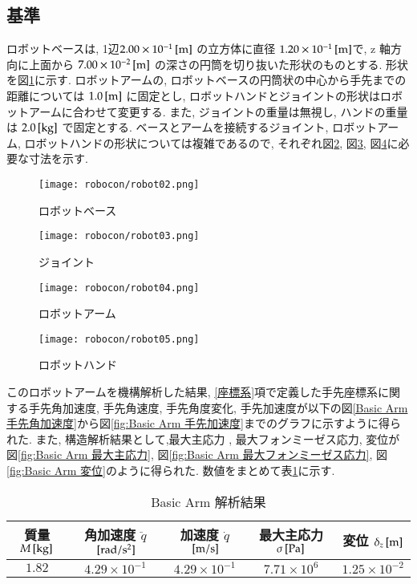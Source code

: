 \documentclass[10pt,b5paper,papersize,dvipdfmx]{jsbook}
\begin{document}
\subsection{基準}\label{基準}
ロボットベースは, 1辺$2.00\times10^{-1} \tani*{m}$ の立方体に直径 $1.20\times10^{-1} \tani*{m} $で,  z 軸方向に上面から $7.00\times10^{-2} \tani*{m}$ の深さの円筒を切り抜いた形状のものとする. 形状を図\ref{fig:ロボットベース}に示す. 
ロボットアームの, ロボットベースの円筒状の中心から手先までの距離については $1.0\tani*{m}$ に固定とし, ロボットハンドとジョイントの形状はロボットアームに合わせて変更する. また, ジョイントの重量は無視し, ハンドの重量は $2.0\tani*{kg}$ で固定とする. 
ベースとアームを接続するジョイント, ロボットアーム, ロボットハンドの形状については複雑であるので, それぞれ図\ref{fig:ジョイント}, 図\ref{fig:ロボットアーム}, 図\ref{fig:ロボットハンド}に必要な寸法を示す.
\begin{figure}[H]
  \centering
  \texttt{[image: robocon/robot02.png]}
  \caption{ロボットベース}
  \label{fig:ロボットベース}
\end{figure}
\begin{figure}[H]
  \centering
  \texttt{[image: robocon/robot03.png]}
  \caption{ジョイント}
  \label{fig:ジョイント}
\end{figure}
\begin{figure}[H]
  \centering
  \texttt{[image: robocon/robot04.png]}
  \caption{ロボットアーム}
  \label{fig:ロボットアーム}
\end{figure}
\begin{figure}[H]
  \centering
  \texttt{[image: robocon/robot05.png]}
  \caption{ロボットハンド}
  \label{fig:ロボットハンド}
\end{figure}
このロボットアームを機構解析した結果, \ref{座標系}項で定義した手先座標系に関する手先角加速度, 手先角速度, 手先角度変化, 手先加速度が以下の図\ref{Basic Arm 手先角加速度}から図\ref{fig:Basic Arm 手先加速度}までのグラフに示すように得られた. 
また, 構造解析結果として,最大主応力 , 最大フォンミーゼス応力, 変位が図\ref{fig:Basic Arm 最大主応力}, 図\ref{fig:Basic Arm 最大フォンミーゼス応力}, 図\ref{fig:Basic Arm 変位}のように得られた. 
数値をまとめて表\ref{tbl:Basic Arm 解析結果}に示す.

\begin{table}[H]
  \centering
  \caption{Basic Arm 解析結果}
  \label{tbl:Basic Arm 解析結果}
  \begin{tabular}{|c|c|c|c|c|} \hline
    質量 $M\tani*{kg}$ & 角加速度 $\ddot{q} $$\tani*{rad/s^2}$ & 加速度 $\dot{q}$$\tani*{m/s}$ & 最大主応力 $\sigma\tani*{Pa}$ & 変位 $\delta_z\tani*{m}$ \\ \hline
    $1.82$ & $4.29\times 10^{-1}$ & $4.29\times 10^{-1}$ & $7.71\times 10^6$ & $1.25\times 10^{-2}$ \\ \hline
  \end{tabular}
\end{table}
\end{document}
